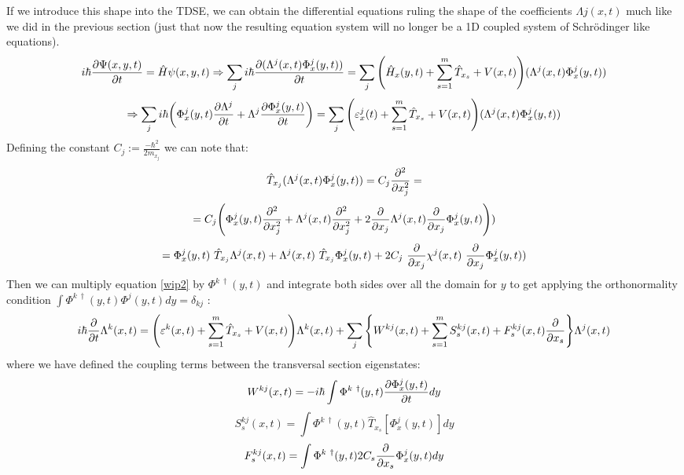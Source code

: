 \documentclass[11pt, a4paper]{article} %
\begin{document}
If we introduce this shape into the TDSE, we can obtain the differential equations ruling the shape of the coefficients $\Lambda j(x,t)$ much like we did in the previous section (just that now the resulting equation system will no longer be a 1D coupled system of Schrödinger like equations).
\begin{equation}\label{wip2}
i\hbar \pdv{\Psi(x,y,t)}{t}=\hat{H}\psi(x,y,t)\Rightarrow \sum_j i\hbar \pdv{(\Lambda^j(x,t)\Phi^j_x(y,t))}{t}=\sum_j\qty(\hat{H}_x(y,t)+\sum_{s=1}^m\hat{T}_{x_s}+V(x,t))(\Lambda^j(x,t)\Phi^j_x(y,t))
\end{equation}
$$
\Rightarrow \sum_j i\hbar\qty( \Phi^j_x(y,t)\pdv{\Lambda^j}{t} + \Lambda^j\pdv{\Phi^j_x(y,t)}{t}) = \sum_j\qty(\varepsilon^j_x(t)+\sum_{s=1}^m\hat{T}_{x_s}+V(x,t))(\Lambda^j(x,t)\Phi^j_x(y,t))
$$
Defining the constant $C_j:=\frac{-\hbar^2}{2m_{x_j}}$ we can note that:
\begin{equation}
\hat{T}_{x_j} (\Lambda^j(x,t)\Phi^j_x(y,t)) = C_j\pdv[2]{}{x_j}(\Lambda^j(x,t)\Phi^j_x(y,t))=
\end{equation}
$$
=C_j\qty(\Phi^j_x(y,t)\pdv[2]{}{x_j}(\Lambda^j(x,t))+\Lambda^j(x,t)\pdv[2]{}{x_j}(\Phi^j_x(y,t)) +2 \pdv{}{x_j}\Lambda^j(x,t) \pdv{}{x_j}\Phi^j_x(y,t)))
$$
$$
=\Phi^j_x(y,t)\ \hat{T}_{x_j} \Lambda^j(x,t) + \Lambda^j(x,t)\  \hat{T}_{x_j}  \Phi^j_x(y,t) +2C_j\ \pdv{}{x_j}\chi^j(x,t)\ \pdv{}{x_j}\Phi^j_x(y,t))
$$
Then we can multiply equation \eqref{wip2} by $\Phi^{k\ \dagger}(y,t)$ and integrate both sides over all the domain for $y$ to get applying the orthonormality condition $\int \Phi^{k\ \dagger}(y,t) \Phi^{j}(y,t) dy= \delta_{kj}$ :
\begin{equation}\label{XabEq}
i\hbar \pdv{}{t}\Lambda^k(x,t) = \qty( \varepsilon^k(x,t) + \sum_{s=1}^m\hat{T}_{x_s}+V(x,t))\Lambda^k(x,t)+ \sum_j \qty{ W^{kj}(x,t) + \sum_{s=1}^m S^{kj}_s(x,t)+F^{kj}_s(x,t)\pdv{}{x_s} } \Lambda^j(x,t) 
\end{equation}
where we have defined the coupling terms between the transversal section eigenstates:
\begin{equation}
W^{kj}(x,t) = -i\hbar\int \Phi^{k\ \dagger}(y,t) \pdv{\Phi^j_x(y,t)}{t} dy
\end{equation}
\begin{equation}
S^{kj}_s(x,t) = \int \Phi^{k\ \dagger}(y,t) \hat{T}_{x_s} [\Phi^j_x(y,t)] dy
\end{equation}
\begin{equation}
F^{kj}_s(x,t) = \int \Phi^{k\ \dagger}(y,t) 2C_s \pdv{}{x_s}\Phi^j_x(y,t) dy
\end{equation}
\end{document}

